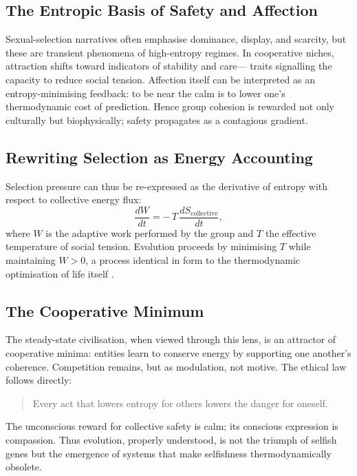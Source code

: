 \documentclass[12pt,a4paper]{article}
\begin{document}
\subsection{The Entropic Basis of Safety and Affection}

Sexual-selection narratives often emphasise dominance, display, and scarcity,
but these are transient phenomena of high-entropy regimes.
In cooperative niches, attraction shifts toward indicators of stability and care—
traits signalling the capacity to reduce social tension.
Affection itself can be interpreted as an entropy-minimising feedback:
to be near the calm is to lower one’s thermodynamic cost of prediction.
Hence group cohesion is rewarded not only culturally but biophysically;
safety propagates as a contagious gradient.

\subsection{Rewriting Selection as Energy Accounting}

Selection pressure can thus be re-expressed
as the derivative of entropy with respect to collective energy flux:
\[
\frac{dW}{dt} = -\,T\,\frac{dS_{\text{collective}}}{dt},
\]
where $W$ is the adaptive work performed by the group and
$T$ the effective temperature of social tension.
Evolution proceeds by minimising $T$ while maintaining $W>0$,
a process identical in form to the thermodynamic optimisation of life itself
\citep{friston2023active,dalziel2022thermodynamics}.

\subsection{The Cooperative Minimum}

The steady-state civilisation, when viewed through this lens,
is an attractor of cooperative minima:  
entities learn to conserve energy by supporting one another’s coherence.
Competition remains, but as modulation, not motive.
The ethical law follows directly:

\begin{quote}
Every act that lowers entropy for others  
lowers the danger for oneself.
\end{quote}

The unconscious reward for collective safety is calm;
its conscious expression is compassion.
Thus evolution, properly understood, is not the triumph of selfish genes
but the emergence of systems that make selfishness thermodynamically obsolete.
\end{document}
